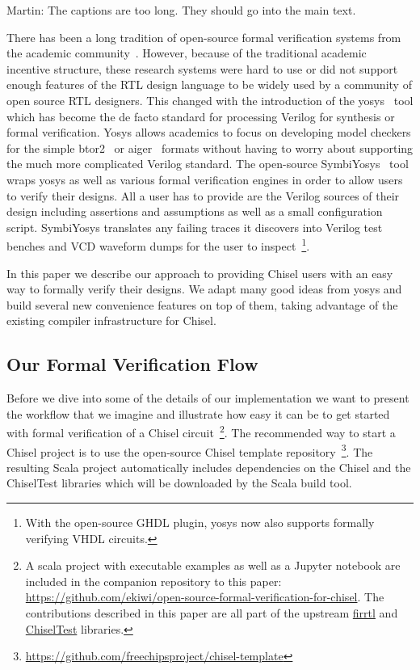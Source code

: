 \documentclass[conference]{IEEEtran}
\newcommand{\martin}[1]{{\color{blue} Martin: #1}}
\begin{document}
\martin{The captions are too long. They should go into the main text.}

There has been a long tradition of open-source formal verification systems from the academic community~\cite{mcmillan1993smv, cimatti2000nusmv, mishchenko2007abc}.
However, because of the traditional academic incentive structure, these research systems were hard to use or did not support
enough features of the RTL design language to be widely used by a community of open source RTL designers.
This changed with the introduction of the yosys~\cite{Yosys} tool which has become the de facto standard for processing
Verilog for synthesis or formal verification.
Yosys allows academics to focus on developing model checkers for the simple btor2~\cite{btor2} or aiger~\cite{aiger} formats
without having to worry about supporting the much more complicated Verilog standard.
The open-source SymbiYosys~\cite{symbiyosys} tool wraps yosys as well as various formal verification engines in order to allow users to
verify their designs. All a user has to provide are the Verilog sources of their design including assertions and assumptions
as well as a small configuration script. SymbiYosys translates any failing traces it discovers into Verilog test benches and VCD waveform dumps
for the user to inspect~\footnote{With the open-source GHDL plugin, yosys now also supports formally verifying VHDL circuits.}.


In this paper we describe our approach to providing Chisel users with an easy way to formally verify their designs.
We adapt many good ideas from yosys and build several new convenience features on top of them, taking advantage
of the existing compiler infrastructure for Chisel.

\subsection{Our Formal Verification Flow}\label{sec:flow}


Before we dive into some of the details of our implementation we want to present
the workflow that we imagine and illustrate how easy it can be to get started
with formal verification of a Chisel circuit~\footnote{
A scala project with executable examples as well as a Jupyter notebook are included in the companion repository to this paper:
\url{https://github.com/ekiwi/open-source-formal-verification-for-chisel}.
The contributions described in this paper are all part of the upstream \href{https://github.com/chipsalliance/firrtl}{firrtl}
and \href{https://github.com/ucb-bar/chiseltest}{ChiselTest} libraries.
}.
The recommended way to start a Chisel project is to use the open-source Chisel template 
repository~\footnote{\url{https://github.com/freechipsproject/chisel-template}}.
The resulting Scala project automatically includes dependencies on the Chisel and the ChiselTest
libraries which will be downloaded by the Scala build tool.
\end{document}
